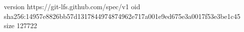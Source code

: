 version https://git-lfs.github.com/spec/v1
oid sha256:14957e8826bb57d1317844974874962e717a001e9ed675e3a0017f53e3be1c45
size 127722

